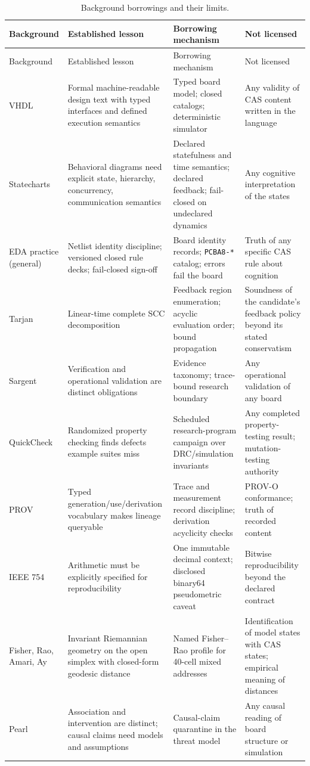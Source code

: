\begin{longtable}{@{}p{2.6cm}p{3.4cm}p{3.4cm}p{4.0cm}@{}}
\caption{Background borrowings and their limits.}\label{ch02:tab:map}\\
\toprule
Background & Established lesson & Borrowing mechanism & Not licensed \\
\midrule
\endfirsthead
\toprule
Background & Established lesson & Borrowing mechanism & Not licensed \\
\midrule
\endhead
\bottomrule
\endfoot
VHDL \cite{vhdl} & Formal machine-readable design text with typed
interfaces and defined execution semantics & Typed board model; closed
catalogs; deterministic simulator & Any validity of CAS content written
in the language \\
Statecharts \cite{harel} & Behavioral diagrams need explicit state,
hierarchy, concurrency, communication semantics & Declared statefulness
and time semantics; declared feedback; fail-closed on undeclared
dynamics & Any cognitive interpretation of the states \\
EDA practice (general) & Netlist identity discipline; versioned closed
rule decks; fail-closed sign-off & Board identity records;
\texttt{PCBA8-*} catalog; errors fail the board & Truth of any specific
CAS rule about cognition \\
Tarjan \cite{tarjan} & Linear-time complete SCC decomposition & Feedback
region enumeration; acyclic evaluation order; bound propagation &
Soundness of the candidate's feedback policy beyond its stated
conservatism \\
Sargent \cite{sargent} & Verification and operational validation are
distinct obligations & Evidence taxonomy; trace-bound research boundary
& Any operational validation of any board \\
QuickCheck \cite{quickcheck} & Randomized property checking finds
defects example suites miss & Scheduled research-program campaign over
DRC/simulation invariants & Any completed property-testing result;
mutation-testing authority \\
PROV \cite{prov} & Typed generation/use/derivation vocabulary makes
lineage queryable & Trace and measurement record discipline; derivation
acyclicity checks & PROV-O conformance; truth of recorded content \\
IEEE 754 \cite{ieee754} & Arithmetic must be explicitly specified for
reproducibility & One immutable decimal context; disclosed binary64
pseudometric caveat & Bitwise reproducibility beyond the declared
contract \\
Fisher, Rao, Amari, Ay \cite{fisher,rao,amari,ay} & Invariant Riemannian
geometry on the open simplex with closed-form geodesic distance & Named
Fisher--Rao profile for 40-cell mixed addresses & Identification of
model states with CAS states; empirical meaning of distances \\
Pearl \cite{pearl} & Association and intervention are distinct; causal
claims need models and assumptions & Causal-claim quarantine in the
threat model & Any causal reading of board structure or simulation \\
\end{longtable}

